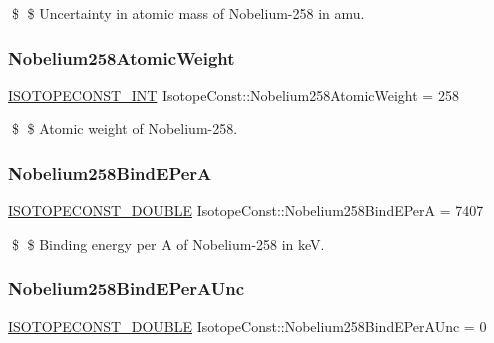 \$ \$ Uncertainty in atomic mass of Nobelium-\/258 in amu. \mbox{\label{group___isotope_const-_nobelium-_no258_gadad9920b21d3cf3b6666777727b71dfb}} 
\subsubsection{\texorpdfstring{Nobelium258\+Atomic\+Weight}{Nobelium258AtomicWeight}}
{\footnotesize\ttfamily \mbox{\hyperlink{group___isotope_const-_macros_ga5f18360b3e99483a35c32d789e62621c}{I\+S\+O\+T\+O\+P\+E\+C\+O\+N\+S\+T\+\_\+\+I\+NT}} Isotope\+Const\+::\+Nobelium258\+Atomic\+Weight = 258}

\$ \$ Atomic weight of Nobelium-\/258. \mbox{\label{group___isotope_const-_nobelium-_no258_gafcf1d58b8d03d3d88b525c89443b935e}} 
\subsubsection{\texorpdfstring{Nobelium258\+Bind\+E\+PerA}{Nobelium258BindEPerA}}
{\footnotesize\ttfamily \mbox{\hyperlink{group___isotope_const-_macros_ga8f45a7272ce02c0b4c65c44636ed719a}{I\+S\+O\+T\+O\+P\+E\+C\+O\+N\+S\+T\+\_\+\+D\+O\+U\+B\+LE}} Isotope\+Const\+::\+Nobelium258\+Bind\+E\+PerA = 7407}

\$ \$ Binding energy per A of Nobelium-\/258 in keV. \mbox{\label{group___isotope_const-_nobelium-_no258_ga8fc3fe26c84bd15540075dbc1d51c58b}} 
\subsubsection{\texorpdfstring{Nobelium258\+Bind\+E\+Per\+A\+Unc}{Nobelium258BindEPerAUnc}}
{\footnotesize\ttfamily \mbox{\hyperlink{group___isotope_const-_macros_ga8f45a7272ce02c0b4c65c44636ed719a}{I\+S\+O\+T\+O\+P\+E\+C\+O\+N\+S\+T\+\_\+\+D\+O\+U\+B\+LE}} Isotope\+Const\+::\+Nobelium258\+Bind\+E\+Per\+A\+Unc = 0}

